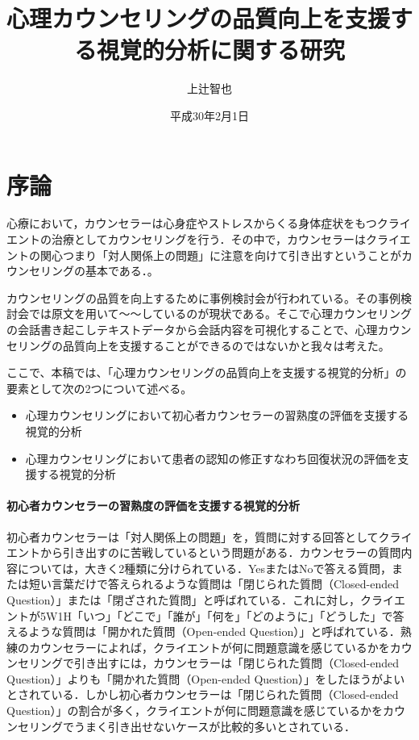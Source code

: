 \documentclass[shuuron]{kuee}
\title{心理カウンセリングの品質向上を支援する視覚的分析に関する研究}
\author{上辻智也}
\date{平成30年2月1日}
\begin{document}
\maketitle
\tableofcontents


\chapter{序論}
心療において，カウンセラーは心身症やストレスからくる身体症状をもつクライエントの治療としてカウンセリングを行う．その中で，カウンセラーはクライエントの関心つまり「対人関係上の問題」に注意を向けて引き出すということがカウンセリングの基本である\cite{zokad}．。




カウンセリングの品質を向上するために事例検討会が行われている。その事例検討会では原文を用いて〜〜しているのが現状である。そこで心理カウンセリングの会話書き起こしテキストデータから会話内容を可視化することで、心理カウンセリングの品質向上を支援することができるのではないかと我々は考えた。

ここで、本稿では、「心理カウンセリングの品質向上を支援する視覚的分析」の要素として次の2つについて述べる。
\begin{itemize}
\item 心理カウンセリングにおいて初心者カウンセラーの習熟度の評価を支援する視覚的分析
\item 心理カウンセリングにおいて患者の認知の修正すなわち回復状況の評価を支援する視覚的分析
\end{itemize}




\subsubsection{初心者カウンセラーの習熟度の評価を支援する視覚的分析}



初心者カウンセラーは「対人関係上の問題」を，質問に対する回答としてクライエントから引き出すのに苦戦しているという問題がある．カウンセラーの質問内容については，大きく2種類に分けられている．YesまたはNoで答える質問，または短い言葉だけで答えられるような質問は「閉じられた質問（Closed-ended Question）」または「閉ざされた質問」と呼ばれている．これに対し，クライエントが5W1H「いつ」「どこで」「誰が」「何を」「どのように」「どうした」で答えるような質問は「開かれた質問（Open-ended Question）」と呼ばれている．熟練のカウンセラーによれば，クライエントが何に問題意識を感じているかをカウンセリングで引き出すには，カウンセラーは「閉じられた質問（Closed-ended Question）」よりも「開かれた質問（Open-ended Question）」をしたほうがよいとされている．しかし初心者カウンセラーは「閉じられた質問（Closed-ended Question）」の割合が多く，クライエントが何に問題意識を感じているかをカウンセリングでうまく引き出せないケースが比較的多いとされている．
\end{document}

